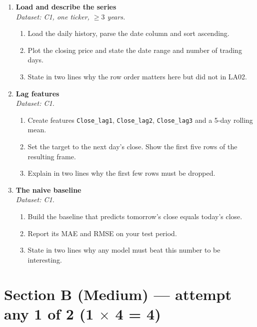 \documentclass[11pt,a4paper]{article}
\begin{document}
\begin{enumerate}[label=\textbf{A\arabic*.}, leftmargin=*]

  \item \textbf{Load and describe the series} \\
    \emph{Dataset: C1, one ticker, $\geq 3$ years.}
    \begin{enumerate}[label=(\alph*), leftmargin=*]
      \item Load the daily history, parse the date column and sort ascending.
      \item Plot the closing price and state the date range and number of trading days.
      \item State in two lines why the row order matters here but did not in LA02.
    \end{enumerate}

  \item \textbf{Lag features} \\
    \emph{Dataset: C1.}
    \begin{enumerate}[label=(\alph*), leftmargin=*]
      \item Create features \texttt{Close\_lag1}, \texttt{Close\_lag2}, \texttt{Close\_lag3} and a 5-day rolling mean.
      \item Set the target to the next day's close. Show the first five rows of the resulting frame.
      \item Explain in two lines why the first few rows must be dropped.
    \end{enumerate}

  \item \textbf{The naive baseline} \\
    \emph{Dataset: C1.}
    \begin{enumerate}[label=(\alph*), leftmargin=*]
      \item Build the baseline that predicts tomorrow's close equals today's close.
      \item Report its MAE and RMSE on your test period.
      \item State in two lines why any model must beat this number to be interesting.
    \end{enumerate}

\end{enumerate}

\section*{Section B (Medium) --- attempt any 1 of 2 \quad (1 $\times$ 4 = 4)}
\end{document}
